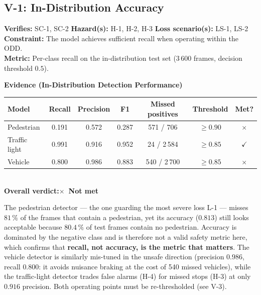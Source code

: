 \documentclass[a4paper,12pt]{article}
\makeatletter
\newcommand{\verdictnotmet}{\textbf{\color{mls@red}$\times$~Not met}}
\newcommand{\verdictline}[1]{\textbf{Overall verdict:}\quad #1}
\newcommand{\yes}{{\color{mls@green}$\checkmark$}}
\newcommand{\no}{{\color{mls@red}$\times$}}
\makeatother
\begin{document}
\subsection{V-1: In-Distribution Accuracy}

\begin{mdframed}[style=subclaim]
\textbf{Verifies:} SC-1, SC-2 \quad \textbf{Hazard(s):} H-1, H-2, H-3 \quad
\textbf{Loss scenario(s):} LS-1, LS-2\\
\textbf{Constraint:} The model achieves sufficient recall when operating within the ODD.\\
\textbf{Metric:} Per-class recall on the in-distribution test set (3\,600 frames,
decision threshold $0.5$).
\end{mdframed}

\begin{mdframed}[style=evidencestyle]
\textbf{Evidence (In-Distribution Detection Performance)}\\

\centering
\small
\begin{tabular}{@{}lcccccc@{}}
\toprule
\textbf{Model} & \textbf{Recall} & \textbf{Precision} & \textbf{F1} &
\textbf{Missed positives} & \textbf{Threshold} & \textbf{Met?} \\
\midrule
Pedestrian    & 0.191 & 0.572 & 0.287 & 571 / 706   & $\geq 0.90$ & \no \\
Traffic light & 0.991 & 0.916 & 0.952 & 24 / 2\,584 & $\geq 0.85$ & \yes \\
Vehicle       & 0.800 & 0.986 & 0.883 & 540 / 2\,700 & $\geq 0.85$ & \no \\
\bottomrule
\end{tabular}\\

\bigskip
\verdictline{\verdictnotmet}
\end{mdframed}

\noindent The pedestrian detector --- the one guarding the most severe loss L-1 --- misses
$81\,\%$ of the frames that contain a pedestrian, yet its accuracy ($0.813$) still looks
acceptable because $80.4\,\%$ of test frames contain no pedestrian. Accuracy is dominated
by the negative class and is therefore not a valid safety metric here, which confirms that
\textbf{recall, not accuracy, is the metric that matters}. The vehicle detector is
similarly mis-tuned in the unsafe direction (precision $0.986$, recall $0.800$: it avoids
nuisance braking at the cost of 540 missed vehicles), while the traffic-light detector
trades false alarms (H-4) for missed stops (H-3) at only $0.916$ precision. Both operating
points must be re-thresholded (see V-3).
\end{document}
